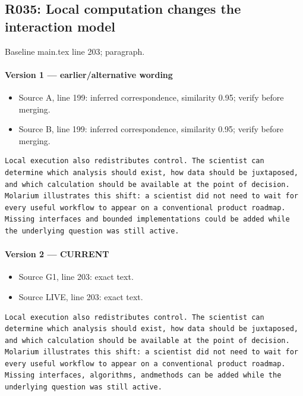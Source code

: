 \documentclass[11pt]{article}
\begin{document}
\subsection{R035: Local computation changes the interaction model}

Baseline main.tex line 203; paragraph.

\paragraph{Version 1 --- earlier/alternative wording}

\begin{itemize}[leftmargin=*]
\item Source A, line 199: inferred correspondence, similarity 0.95; verify before merging.
\item Source B, line 199: inferred correspondence, similarity 0.95; verify before merging.
\end{itemize}

\begin{lstlisting}
Local execution also redistributes control. The scientist can determine which analysis should exist, how data should be juxtaposed, and which calculation should be available at the point of decision. Molarium illustrates this shift: a scientist did not need to wait for every useful workflow to appear on a conventional product roadmap. Missing interfaces and bounded implementations could be added while the underlying question was still active.
\end{lstlisting}

\paragraph{Version 2 --- CURRENT}

\begin{itemize}[leftmargin=*]
\item Source G1, line 203: exact text.
\item Source LIVE, line 203: exact text.
\end{itemize}

\begin{lstlisting}
Local execution also redistributes control. The scientist can determine which analysis should exist, how data should be juxtaposed, and which calculation should be available at the point of decision. Molarium illustrates this shift: a scientist did not need to wait for every useful workflow to appear on a conventional product roadmap. Missing interfaces, algorithms, andmethods can be added while the underlying question was still active.
\end{lstlisting}
\end{document}
